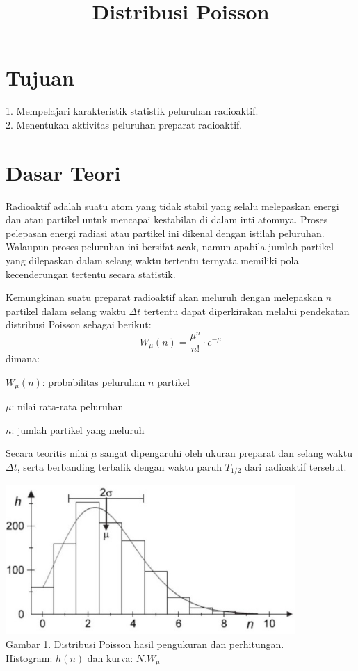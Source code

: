 \documentclass{article}
\title{Distribusi Poisson}
\date{}
\author{}
\begin{document}
	\maketitle
	
	\section{Tujuan}
		1. Mempelajari karakteristik statistik peluruhan radioaktif.\\
		2. Menentukan aktivitas peluruhan preparat radioaktif.
	
	\section{Dasar Teori}
	 
		\hspace{0.35 cm} Radioaktif adalah suatu atom yang tidak stabil yang selalu melepaskan energi dan atau partikel untuk mencapai kestabilan di dalam inti atomnya. Proses pelepasan energi radiasi atau partikel ini dikenal dengan istilah peluruhan. Walaupun proses peluruhan ini bersifat acak, namun apabila jumlah partikel yang dilepaskan dalam selang waktu tertentu ternyata memiliki pola kecenderungan tertentu secara statistik.\par
		Kemungkinan suatu preparat radioaktif akan meluruh dengan melepaskan $n$ partikel dalam selang waktu $\Delta t$ tertentu dapat diperkirakan melalui pendekatan distribusi Poisson
		sebagai berikut: 
		\begin{equation}
		W_{\mu}(n) = \frac{\mu^n}{n!}\cdot e^{-\mu}
		\end{equation}
		dimana:
		\par $W_{\mu}(n)$: probabilitas peluruhan $n$ partikel
		\par $\mu$: nilai rata-rata peluruhan
		\par $n$: jumlah partikel yang meluruh \\
		
		\par Secara teoritis nilai $\mu$ sangat dipengaruhi oleh ukuran preparat dan selang waktu $\Delta t$, serta berbanding terbalik dengan waktu paruh $T_{1/2}$ dari radioaktif tersebut. 
	
		
		
		\begin{center}
			\includegraphics[width=110mm]{Picture/1.jpg}\\
			Gambar 1. Distribusi Poisson hasil pengukuran dan perhitungan. \\ Histogram: $h(n)$ dan kurva: $N.W_{\mu}$
		\end{center}
		
\end{document}
